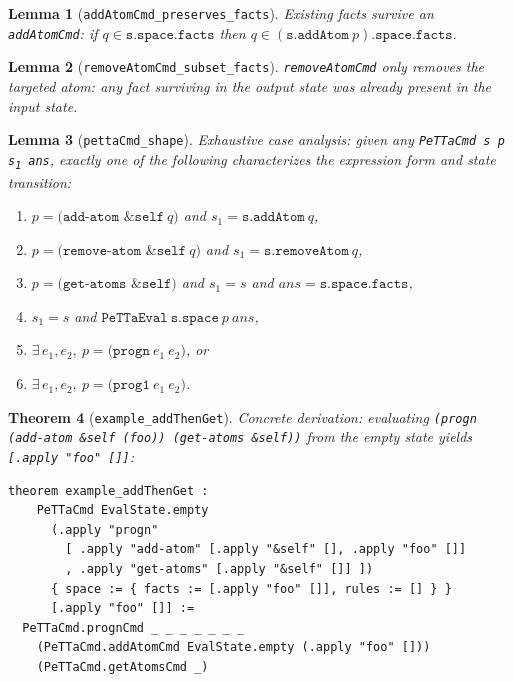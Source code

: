 \documentclass[]{article}
\newtheorem{theorem}{Theorem}
\newtheorem{lemma}[theorem]{Lemma}
\newcommand{\code}[1]{\texttt{#1}}
\begin{document}
\begin{lemma}[\code{addAtomCmd\_preserves\_facts}]
Existing facts survive an \code{addAtomCmd}: if $q \in \code{s.space.facts}$
then $q \in (\code{s.addAtom}\ p)\code{.space.facts}$.
\end{lemma}

\begin{lemma}[\code{removeAtomCmd\_subset\_facts}]
\code{removeAtomCmd} only removes the targeted atom: any fact surviving in
the output state was already present in the input state.
\end{lemma}

\begin{lemma}[\code{pettaCmd\_shape}]
Exhaustive case analysis: given any \code{PeTTaCmd s p s\textsubscript{1} ans},
exactly one of the following characterizes the expression form and state transition:
\begin{enumerate}
  \item $p = \code{(add-atom \&self}\ q\code{)}$ and $s_1 = \code{s.addAtom}\ q$,
  \item $p = \code{(remove-atom \&self}\ q\code{)}$ and $s_1 = \code{s.removeAtom}\ q$,
  \item $p = \code{(get-atoms \&self)}$ and $s_1 = s$ and $ans = \code{s.space.facts}$,
  \item $s_1 = s$ and $\code{PeTTaEval}\ \code{s.space}\ p\ ans$,
  \item $\exists\, e_1, e_2,\ p = \code{(progn}\ e_1\ e_2\code{)}$, or
  \item $\exists\, e_1, e_2,\ p = \code{(prog1}\ e_1\ e_2\code{)}$.
\end{enumerate}
\end{lemma}

\begin{theorem}[\code{example\_addThenGet}]
Concrete derivation: evaluating \code{(progn (add-atom \&self (foo)) (get-atoms \&self))}
from the empty state yields \code{[.apply "foo" []]}:
\begin{lstlisting}[language=lean]
theorem example_addThenGet :
    PeTTaCmd EvalState.empty
      (.apply "progn"
        [ .apply "add-atom" [.apply "&self" [], .apply "foo" []]
        , .apply "get-atoms" [.apply "&self" []] ])
      { space := { facts := [.apply "foo" []], rules := [] } }
      [.apply "foo" []] :=
  PeTTaCmd.prognCmd _ _ _ _ _ _ _
    (PeTTaCmd.addAtomCmd EvalState.empty (.apply "foo" []))
    (PeTTaCmd.getAtomsCmd _)
\end{lstlisting}
\end{theorem}
\end{document}
